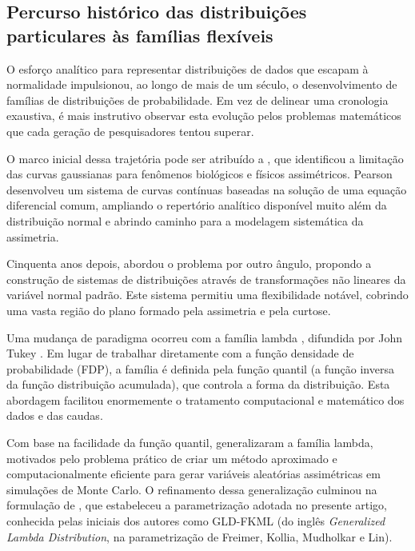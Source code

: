 \subsection{Percurso histórico das distribuições particulares às famílias flexíveis}

O esforço analítico para representar distribuições de dados que escapam à normalidade impulsionou, ao longo de mais de um século, o desenvolvimento de famílias de distribuições de probabilidade. Em vez de delinear uma cronologia exaustiva, é mais instrutivo observar esta evolução pelos problemas matemáticos que cada geração de pesquisadores tentou superar.

O marco inicial dessa trajetória pode ser atribuído a \textcite{pearson1895}, que identificou a limitação das curvas gaussianas para fenômenos biológicos e físicos assimétricos. Pearson desenvolveu um sistema de curvas contínuas baseadas na solução de uma equação diferencial comum, ampliando o repertório analítico disponível muito além da distribuição normal e abrindo caminho para a modelagem sistemática da assimetria.

Cinquenta anos depois, \textcite{johnson1949} abordou o problema por outro ângulo, propondo a construção de sistemas de distribuições através de transformações não lineares da variável normal padrão. Este sistema permitiu uma flexibilidade notável, cobrindo uma vasta região do plano formado pela assimetria e pela curtose.

Uma mudança de paradigma ocorreu com a família lambda \parencite{hastings1947}, difundida por John Tukey \parencite{tukey1960}. Em lugar de trabalhar diretamente com a função densidade de probabilidade (FDP), a família é definida pela função quantil (a função inversa da função distribuição acumulada), que controla a forma da distribuição. Esta abordagem facilitou enormemente o tratamento computacional e matemático dos dados e das caudas.

Com base na facilidade da função quantil, \textcite{ramberg1974} generalizaram a família lambda, motivados pelo problema prático de criar um método aproximado e computacionalmente eficiente para gerar variáveis aleatórias assimétricas em simulações de Monte Carlo. O refinamento dessa generalização culminou na formulação de \textcite{freimer1988}, que estabeleceu a parametrização adotada no presente artigo, conhecida pelas iniciais dos autores como GLD-FKML (do inglês \textit{Generalized Lambda Distribution}, na parametrização de Freimer, Kollia, Mudholkar e Lin).

